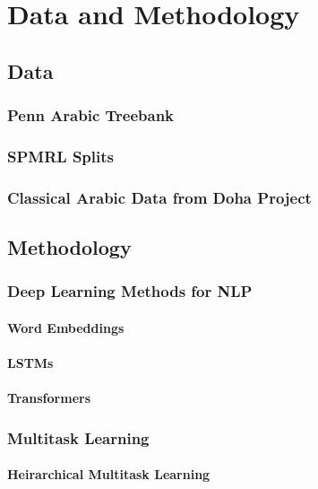 \chapter{Data and Methodology}

\section{Data}
\subsection{Penn Arabic Treebank}
\subsection{SPMRL Splits}
\subsection{Classical Arabic Data from Doha Project}

\section{Methodology}
\subsection{Deep Learning Methods for NLP}
\subsubsection{Word Embeddings}
\subsubsection{LSTMs}
\subsubsection{Transformers}

\subsection{Multitask Learning}
\subsubsection{Heirarchical Multitask Learning}
